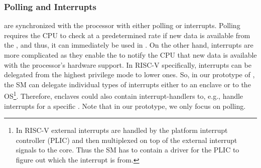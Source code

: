 %      



\subsubsection*{Polling and Interrupts}
\sphw are synchronized with the processor with either polling or interrupts. Polling requires the CPU to check at a predetermined rate if new data is available from the \sphw, and thus, it can immediately be used in \name{}. On the other hand, interrupts are more complicated as they enable the \sphw to notify the CPU that new data is available with the processor's hardware support. In RISC-V specifically, interrupts can be delegated from the highest privilege mode to lower ones. So, in our prototype of \name{}, the SM can delegate individual types of interrupts either to an enclave or to the OS\footnote{In RISC-V external interrupts are handled by the platform interrupt controller (PLIC) and then multiplexed on top of the external interrupt signals to the core. Thus the SM has to contain a driver for the PLIC to figure out which \sphw the interrupt is from.}. Therefore, enclaves could also contain interrupt-handlers to, e.g., handle interrupts for a specific \sphw. Note that in our prototype, we only focus on polling. 

